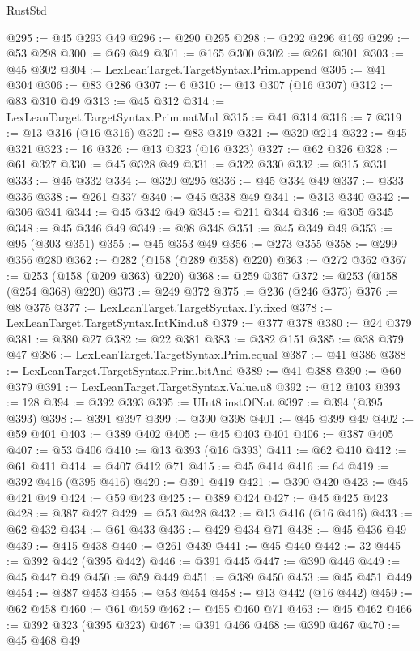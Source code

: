 \begin{lexlean}{RustStd}
\begin{coremodule}
{\begin{coremodule}
{{{{{{{{{{{{@295 := @45 @293 @49
@296 := @290 @295
@298 := @292 @296 @169
@299 := @53 @298
@300 := @69 @49
@301 := @165 @300
@302 := @261 @301
@303 := @45 @302
@304 := LexLeanTarget.TargetSyntax.Prim.append
@305 := @41 @304
@306 := @83 @286
@307 := 6
@310 := @13 @307 (@16 @307)
@312 := @83 @310 @49
@313 := @45 @312
@314 := LexLeanTarget.TargetSyntax.Prim.natMul
@315 := @41 @314
@316 := 7
@319 := @13 @316 (@16 @316)
@320 := @83 @319
@321 := @320 @214
@322 := @45 @321
@323 := 16
@326 := @13 @323 (@16 @323)
@327 := @62 @326
@328 := @61 @327
@330 := @45 @328 @49
@331 := @322 @330
@332 := @315 @331
@333 := @45 @332
@334 := @320 @295
@336 := @45 @334 @49
@337 := @333 @336
@338 := @261 @337
@340 := @45 @338 @49
@341 := @313 @340
@342 := @306 @341
@344 := @45 @342 @49
@345 := @211 @344
@346 := @305 @345
@348 := @45 @346 @49
@349 := @98 @348
@351 := @45 @349 @49
@353 := @95 (@303 @351)
@355 := @45 @353 @49
@356 := @273 @355
@358 := @299 @356 @280
@362 := @282 (@158 (@289 @358) @220)
@363 := @272 @362
@367 := @253 (@158 (@209 @363) @220)
@368 := @259 @367
@372 := @253 (@158 (@254 @368) @220)
@373 := @249 @372
@375 := @236 (@246 @373)
@376 := @8 @375
@377 := LexLeanTarget.TargetSyntax.Ty.fixed
@378 := LexLeanTarget.TargetSyntax.IntKind.u8
@379 := @377 @378
@380 := @24 @379
@381 := @380 @27
@382 := @22 @381
@383 := @382 @151
@385 := @38 @379 @47
@386 := LexLeanTarget.TargetSyntax.Prim.equal
@387 := @41 @386
@388 := LexLeanTarget.TargetSyntax.Prim.bitAnd
@389 := @41 @388
@390 := @60 @379
@391 := LexLeanTarget.TargetSyntax.Value.u8
@392 := @12 @103
@393 := 128
@394 := @392 @393
@395 := UInt8.instOfNat
@397 := @394 (@395 @393)
@398 := @391 @397
@399 := @390 @398
@401 := @45 @399 @49
@402 := @59 @401
@403 := @389 @402
@405 := @45 @403 @401
@406 := @387 @405
@407 := @53 @406
@410 := @13 @393 (@16 @393)
@411 := @62 @410
@412 := @61 @411
@414 := @407 @412 @71
@415 := @45 @414
@416 := 64
@419 := @392 @416 (@395 @416)
@420 := @391 @419
@421 := @390 @420
@423 := @45 @421 @49
@424 := @59 @423
@425 := @389 @424
@427 := @45 @425 @423
@428 := @387 @427
@429 := @53 @428
@432 := @13 @416 (@16 @416)
@433 := @62 @432
@434 := @61 @433
@436 := @429 @434 @71
@438 := @45 @436 @49
@439 := @415 @438
@440 := @261 @439
@441 := @45 @440
@442 := 32
@445 := @392 @442 (@395 @442)
@446 := @391 @445
@447 := @390 @446
@449 := @45 @447 @49
@450 := @59 @449
@451 := @389 @450
@453 := @45 @451 @449
@454 := @387 @453
@455 := @53 @454
@458 := @13 @442 (@16 @442)
@459 := @62 @458
@460 := @61 @459
@462 := @455 @460 @71
@463 := @45 @462
@466 := @392 @323 (@395 @323)
@467 := @391 @466
@468 := @390 @467
@470 := @45 @468 @49
}}}}}}}}}}}}
\end{coremodule}}
\end{coremodule}
\end{lexlean}
